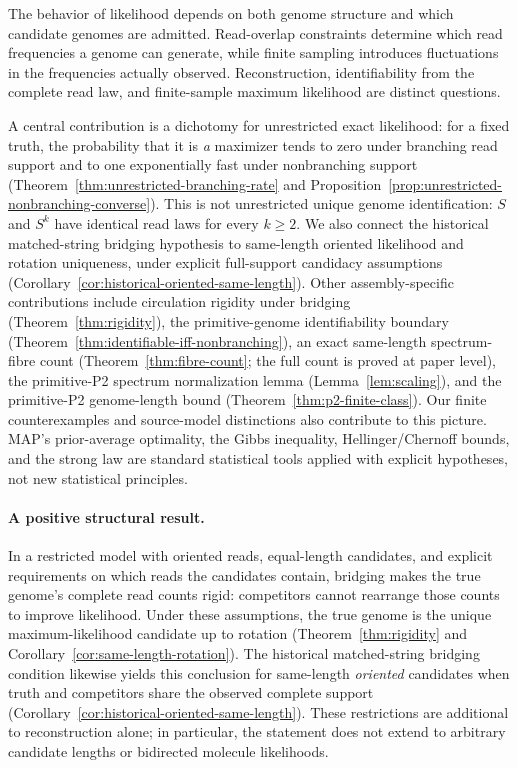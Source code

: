 The behavior of likelihood depends on both genome structure and
which candidate genomes are admitted. Read-overlap constraints
determine which read frequencies a genome can generate, while
finite sampling introduces fluctuations in the frequencies actually
observed. Reconstruction, identifiability from the complete read law,
and finite-sample maximum likelihood are distinct questions.

A central contribution is a dichotomy for unrestricted exact
likelihood: for a fixed truth, the probability that it is
\emph{a} maximizer tends to zero under branching read support
and to one exponentially fast under nonbranching support
(Theorem~\ref{thm:unrestricted-branching-rate} and
Proposition~\ref{prop:unrestricted-nonbranching-converse}).
This is not unrestricted unique genome identification:
$S$ and $S^k$ have identical read laws for every $k\ge2$. We also connect
the historical matched-string bridging hypothesis to
same-length oriented likelihood and rotation uniqueness, under
explicit full-support candidacy assumptions
(Corollary~\ref{cor:historical-oriented-same-length}).
Other assembly-specific contributions include circulation rigidity under
bridging (Theorem~\ref{thm:rigidity}), the primitive-genome
identifiability boundary (Theorem~\ref{thm:identifiable-iff-nonbranching}),
an exact same-length spectrum-fibre count (Theorem~\ref{thm:fibre-count};
the full count is proved at paper level), the primitive-P2 spectrum
normalization lemma (Lemma~\ref{lem:scaling}), and the
primitive-P2 genome-length bound (Theorem~\ref{thm:p2-finite-class}).
Our finite counterexamples and source-model distinctions also
contribute to this picture. MAP's prior-average optimality,
the Gibbs inequality, Hellinger/Chernoff bounds, and the strong
law are standard statistical tools applied with explicit hypotheses,
not new statistical principles.

\paragraph{A positive structural result.}
In a restricted model with oriented reads, equal-length candidates,
and explicit requirements on which reads the candidates contain,
bridging makes the true genome's complete read counts rigid:
competitors cannot rearrange those counts to improve likelihood.
Under these assumptions, the true genome is the unique
maximum-likelihood candidate up to rotation
(Theorem~\ref{thm:rigidity} and
Corollary~\ref{cor:same-length-rotation}).
The historical matched-string bridging condition likewise yields
this conclusion for same-length \emph{oriented} candidates
when truth and competitors share the observed complete support
(Corollary~\ref{cor:historical-oriented-same-length}).
These restrictions are additional to reconstruction alone;
in particular, the statement does not extend to arbitrary
candidate lengths or bidirected molecule likelihoods.


